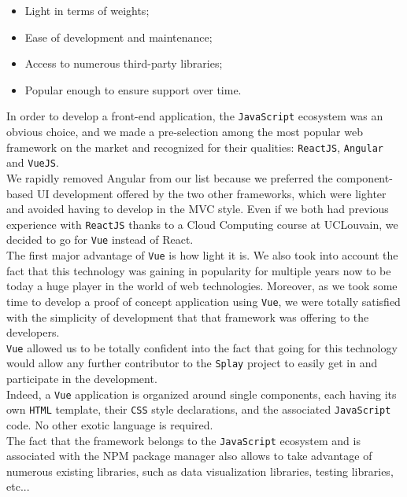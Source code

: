\documentclass{eplmastersthesis}
\begin{document}
        \begin{itemize}
          \item Light in terms of weights;
          \item Ease of development and maintenance;
          \item Access to numerous third-party libraries;
          \item Popular enough to ensure support over time.
        \end{itemize}

        In order to develop a front-end application, the \texttt{JavaScript} ecosystem
        was an obvious choice, and we made a pre-selection among the most
        popular web framework on the market and recognized for their qualities:
        \texttt{ReactJS}, \texttt{Angular} and \texttt{VueJS}.\\
        We rapidly removed Angular from our list because we preferred the
        component-based UI development offered by the two other frameworks,
        which were lighter and avoided having to develop in the MVC style.
        Even if we both had previous experience with \texttt{ReactJS} thanks to a
        Cloud Computing course at UCLouvain, we decided to go for \texttt{Vue}
        instead of React.\\

        The first major advantage of \texttt{Vue} is how light it is. We also took into
        account the fact that this technology was gaining in popularity for
        multiple years now to be today a huge player in the world of web
        technologies. Moreover, as we took some time to develop a proof
        of concept application using \texttt{Vue}, we were totally satisfied with the
        simplicity of development that that framework was offering to the
        developers.\\
        \texttt{Vue} allowed us to be totally confident into the fact
        that going for this technology would allow any further contributor
        to the \texttt{Splay} project to easily get in and participate in the
        development.\\
        Indeed, a \texttt{Vue} application is organized around single components, each
        having its own \texttt{HTML} template, their \texttt{CSS} style declarations, and
        the associated \texttt{JavaScript} code. No other exotic language is required.\\
        The fact that the framework belongs to the \texttt{JavaScript} ecosystem and is
        associated with the NPM package manager also allows to take advantage of
        numerous existing libraries, such as data visualization libraries,
        testing libraries, etc...\\
\end{document}
